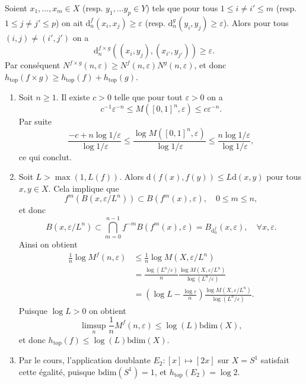 \documentclass[a4paper,12pt,openany]{article}
\theoremstyle{plain}
\theoremstyle{definition}
\newcommand{\dd}{\mathrm{d}}
\newcommand{\htop}{h_\mathrm{top}}
\begin{document}
\begin{enumerate}
Soient $x_1, \dots, x_m \in X$ (resp. $y_1, \dots y_p \in Y$) tels que pour tous $1 \leqslant i \neq i' \leqslant m$ (resp. $1 \leqslant j \neq j' \leqslant p$) on ait
$
\dd_{n}^f(x_i, x_j) \geqslant \varepsilon$ (resp. $\dd^g_n(y_i, y_j) \geqslant \varepsilon$). Alors pour tous $(i,j) \neq (i',j')$ on a 
$$
\dd^{f\times g}_{n}((x_i, y_j), (x_{i'}, y_{j'})) \geqslant \varepsilon.
$$
Par cons\'equent $N^{f\times g}(n, \varepsilon) \geqslant N^f(n, \varepsilon) N^g(n, \varepsilon)$, et donc $\htop(f \times g) \geqslant \htop(f) + \htop(g)$.

\end{enumerate}
\vspace{0.6cm}


 \vspace{1.5mm} 


\begin{enumerate}
\item Soit $n \geqslant 1$. Il existe $c > 0$ telle que pour tout $\varepsilon > 0$ on a
$$
c^{-1} \varepsilon^{-n} \leqslant M([0,1]^n, \varepsilon) \leqslant c  \varepsilon^{-n}.
$$
Par suite
$$
\frac{-c + n \log 1/ \varepsilon}{\log 1 / \varepsilon} \leqslant \frac{\log M([0,1]^n, \varepsilon)}{\log 1/\varepsilon} \leqslant \frac{n \log 1/\varepsilon}{\log 1 / \varepsilon},
$$
ce qui conclut.

\item Soit $L > \max(1, L(f)).$ Alors $\dd(f(x), f(y)) \leqslant L \dd(x,y)$ pour tous $x,y \in X$. Cela implique que
$$
f^m\left(B(x, \varepsilon / L^n)\right) \subset B(f^m(x), \varepsilon), \quad 0 \leqslant m \leqslant n,
$$
et donc 
$$
B(x, \varepsilon / L^n) \subset \bigcap_{m=0}^{n-1} f^{-m} B(f^m(x), \varepsilon) = B_{\dd^f_n}(x, \varepsilon), \quad \forall x, \varepsilon.
$$
Ainsi on obtient
$$
\begin{aligned}
\frac{1}{n} \log M^f(n, \varepsilon) &\leqslant \frac{1}{n} \log M(X, \varepsilon / L^n) \\
&= \frac{\log(L^n/ \varepsilon)}{n} \frac{\log M(X, \varepsilon / L^n)}{\log(L^n/ \varepsilon)} \\
&= \left(\log L - \frac{\log \varepsilon}{n}\right) \frac{\log M(X, \varepsilon / L^n)}{\log(L^n/ \varepsilon)}.
\end{aligned}
$$
Puisque $\log L > 0$ on obtient 
$$
\limsup_n \frac{1}{n} M^f(n, \varepsilon) \leqslant \log(L) \mathrm{bdim}(X),
$$
et donc $\htop(f) \leqslant \log(L) \mathrm{bdim}(X)$.

\item Par le cours, l'application doublante $E_2 : [x] \mapsto [2x]$ sur $X = S^1$ satisfait cette \'egalit\'e, puisque $\mathrm{bdim}(S^1) = 1$, et $\htop(E_2) = \log 2$. 
\end{enumerate}
\vspace{0.6cm}
\end{document}
